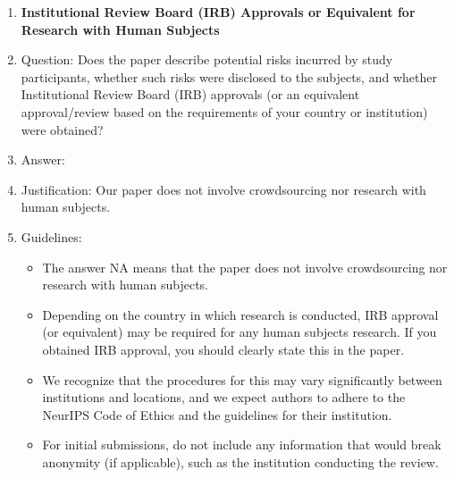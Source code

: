 \documentclass{article}
\theoremstyle{plain}
\theoremstyle{definition}
\theoremstyle{remark}
\begin{document}
\begin{enumerate}
\item {\bf Institutional Review Board (IRB) Approvals or Equivalent for Research with Human Subjects}
    \item[] Question: Does the paper describe potential risks incurred by study participants, whether such risks were disclosed to the subjects, and whether Institutional Review Board (IRB) approvals (or an equivalent approval/review based on the requirements of your country or institution) were obtained?
    \item[] Answer: \answerNA{} %
    \item[] Justification: Our paper does not involve crowdsourcing nor research with human subjects.
    \item[] Guidelines:
    \begin{itemize}
        \item The answer NA means that the paper does not involve crowdsourcing nor research with human subjects.
        \item Depending on the country in which research is conducted, IRB approval (or equivalent) may be required for any human subjects research. If you obtained IRB approval, you should clearly state this in the paper. 
        \item We recognize that the procedures for this may vary significantly between institutions and locations, and we expect authors to adhere to the NeurIPS Code of Ethics and the guidelines for their institution. 
        \item For initial submissions, do not include any information that would break anonymity (if applicable), such as the institution conducting the review.
    \end{itemize}

\end{enumerate}





\clearpage
\end{document}
